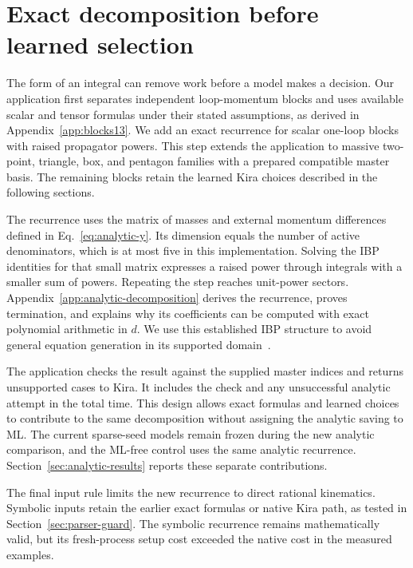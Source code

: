 \section{Exact decomposition before learned selection}
\label{sec:analytic-method}
The form of an integral can remove work before a model makes a decision. Our application first separates independent loop-momentum blocks and uses available scalar and tensor formulas under their stated assumptions, as derived in Appendix~\ref{app:blocks13}. We add an exact recurrence for scalar one-loop blocks with raised propagator powers. This step extends the application to massive two-point, triangle, box, and pentagon families with a prepared compatible master basis. The remaining blocks retain the learned Kira choices described in the following sections.

The recurrence uses the matrix of masses and external momentum differences defined in Eq.~\eqref{eq:analytic-y}. Its dimension equals the number of active denominators, which is at most five in this implementation. Solving the IBP identities for that small matrix expresses a raised power through integrals with a smaller sum of powers. Repeating the step reaches unit-power sectors. Appendix~\ref{app:analytic-decomposition} derives the recurrence, proves termination, and explains why its coefficients can be computed with exact polynomial arithmetic in $d$. We use this established IBP structure to avoid general equation generation in its supported domain~\cite{ChetyrkinTkachov,Hu2025}.

The application checks the result against the supplied master indices and returns unsupported cases to Kira. It includes the check and any unsuccessful analytic attempt in the total time. This design allows exact formulas and learned choices to contribute to the same decomposition without assigning the analytic saving to ML. The current sparse-seed models remain frozen during the new analytic comparison, and the ML-free control uses the same analytic recurrence. Section~\ref{sec:analytic-results} reports these separate contributions.

The final input rule limits the new recurrence to direct rational kinematics. Symbolic inputs retain the earlier exact formulas or native Kira path, as tested in Section~\ref{sec:parser-guard}. The symbolic recurrence remains mathematically valid, but its fresh-process setup cost exceeded the native cost in the measured examples.

